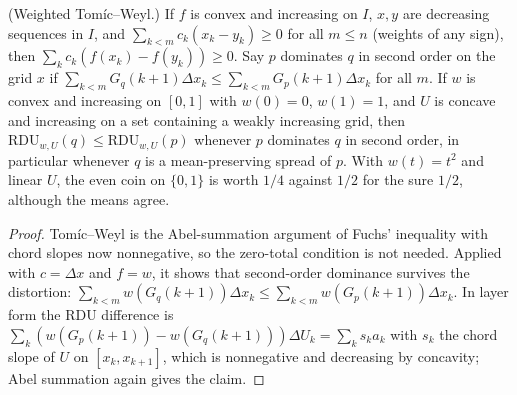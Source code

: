 \begin{theorem}
\label{thm:beh-cks}
\leanok
(Weighted Tom\'ic--Weyl.) If $f$ is convex and increasing on $I$, $x,y$ are decreasing sequences in $I$, and
$\sum_{k<m}c_k(x_k-y_k)\ge0$ for all $m\le n$ (weights of any sign), then $\sum_k c_k(f(x_k)-f(y_k))\ge0$.
Say $p$ dominates $q$ in second order on the grid $x$ if $\sum_{k<m}G_q(k+1)\Delta x_k\le\sum_{k<m}G_p(k+1)\Delta x_k$ for
all $m$. If $w$ is convex and increasing on $[0,1]$ with $w(0)=0$, $w(1)=1$, and $U$ is concave and increasing on a set
containing a weakly increasing grid, then $\mathrm{RDU}_{w,U}(q)\le\mathrm{RDU}_{w,U}(p)$ whenever $p$ dominates $q$ in
second order, in particular whenever $q$ is a mean-preserving spread of $p$. With $w(t)=t^2$ and linear $U$, the even
coin on $\{0,1\}$ is worth $1/4$ against $1/2$ for the sure $1/2$, although the means agree.
\end{theorem}
\begin{proof}
\leanok
Tom\'ic--Weyl is the Abel-summation argument of Fuchs' inequality with chord slopes now nonnegative, so the zero-total
condition is not needed. Applied with $c=\Delta x$ and $f=w$, it shows that second-order dominance survives the distortion:
$\sum_{k<m}w(G_q(k+1))\Delta x_k\le\sum_{k<m}w(G_p(k+1))\Delta x_k$. In layer form the RDU difference is
$\sum_k(w(G_p(k+1))-w(G_q(k+1)))\Delta U_k=\sum_k s_k a_k$ with $s_k$ the chord slope of $U$ on $[x_k,x_{k+1}]$, which
is nonnegative and decreasing by concavity; Abel summation again gives the claim.
\end{proof}

